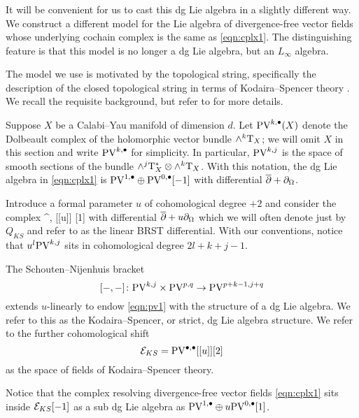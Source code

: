 \documentclass[11pt]{amsart}
\begin{document}
\subsubsection{}
It will be convenient for us to cast this dg Lie algebra in a slightly different way.
We construct a different model for the Lie algebra of divergence-free vector fields whose underlying cochain complex is the same as \eqref{eqn:cplx1}. 
The distinguishing feature is that this model is no longer a dg Lie algebra, but an $L_\infty$ algebra. 

The model we use is motivated by the topological string, specifically the description of the closed topological string in terms of Kodaira--Spencer theory \cite{BCOV}.
We recall the requisite background, but refer to \cite{CLbcov1,CLbcov2,CLtypeI} for more details. 

Suppose $X$ be a Calabi--Yau manifold of dimension $d$. 
Let ${\rm PV}^{k,\bullet}(X)$ denote the Dolbeault complex of the holomorphic vector bundle $\wedge^k {\rm T}_X$; we will omit $X$ in this section and write ${\rm PV}^{k,\bullet}$ for simplicity.
In particular, ${\rm PV}^{k,j}$ is the space of smooth sections of the bundle $\wedge^j {\rm T}_X^* \otimes \wedge^k {\rm T}_X$. 
With this notation, the dg Lie algebra in \eqref{eqn:cplx1} is ${\rm PV}^{1,\bullet} \oplus {\rm PV}^{0,\bullet}[-1]$ with differential $\overline{\partial} + \partial_{\Omega}$. 

Introduce a formal parameter $u$ of cohomological degree $+2$ and consider the complex 
\beqn\label{eqn:pv1}
\PV^{\bu,\bu} [[u]] [1]
\eeqn
with differential $\overline{\partial} + u \partial_{\Omega}$ which we will often denote just by $Q_{KS}$ and refer to as the linear BRST differential. 
With our conventions, notice that $u^l {\rm PV}^{k,j}$ sits in cohomological degree $2l +k + j - 1$. 

The Schouten--Nijenhuis bracket 
\[
[-,-] \colon {\rm PV}^{k,j} \times {\rm PV}^{p,q} \to {\rm PV}^{p+k-1,j+q} 
\]
extends $u$-linearly to endow \eqref{eqn:pv1} with the structure of a dg Lie algebra.
We refer to this as the Kodaira--Spencer, or strict, dg Lie algebra structure.
We refer to the further cohomological shift 
\[
\mathcal E_{KS} = {\rm PV}^{\bullet,\bullet} [[u]] [2]
\]
as the space of fields of Kodaira--Spencer theory.

Notice that the complex resolving divergence-free vector fields \eqref{eqn:cplx1} sits inside $\mathcal E_{KS} [-1]$ as a sub dg Lie algebra as ${\rm PV}^{1,\bullet} \oplus u {\rm PV}^{0,\bullet}[1]$. 

\subsubsection{}
\end{document}

